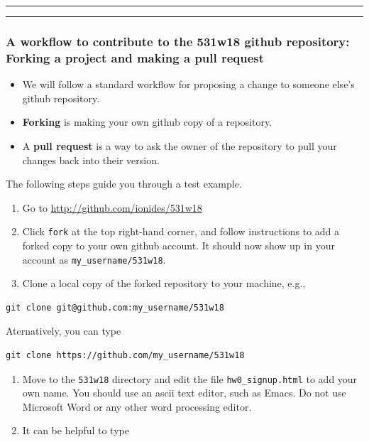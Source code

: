 \documentclass[]{article}
\begin{document}
\begin{center}\rule{0.5\linewidth}{\linethickness}\end{center}

\begin{center}\rule{0.5\linewidth}{\linethickness}\end{center}

\subsubsection{A workflow to contribute to the 531w18 github repository:
Forking a project and making a pull
request}\label{a-workflow-to-contribute-to-the-531w18-github-repository-forking-a-project-and-making-a-pull-request}

\begin{itemize}
\item
  We will follow a standard workflow for proposing a change to someone
  else's github repository.
\item
  \textbf{Forking} is making your own github copy of a repository.
\item
  A \textbf{pull request} is a way to ask the owner of the repository to
  pull your changes back into their version.
\end{itemize}

The following steps guide you through a test example.

\begin{enumerate}
\def\labelenumi{\arabic{enumi}.}
\item
  Go to \url{http://github.com/ionides/531w18}
\item
  Click \texttt{fork} at the top right-hand corner, and follow
  instructions to add a forked copy to your own github account. It
  should now show up in your account as \texttt{my\_username/531w18}.
\item
  Clone a local copy of the forked repository to your machine, e.g.,
\end{enumerate}

\begin{verbatim}
git clone git@github.com:my_username/531w18
\end{verbatim}

Aternatively, you can type

\begin{verbatim}
git clone https://github.com/my_username/531w18
\end{verbatim}

\begin{enumerate}
\def\labelenumi{\arabic{enumi}.}
\setcounter{enumi}{3}
\item
  Move to the \texttt{531w18} directory and edit the file
  \texttt{hw0\_signup.html} to add your own name. You should use an
  ascii text editor, such as Emacs. Do not use Microsoft Word or any
  other word processing editor.
\item
  It can be helpful to type
\end{enumerate}
\end{document}
